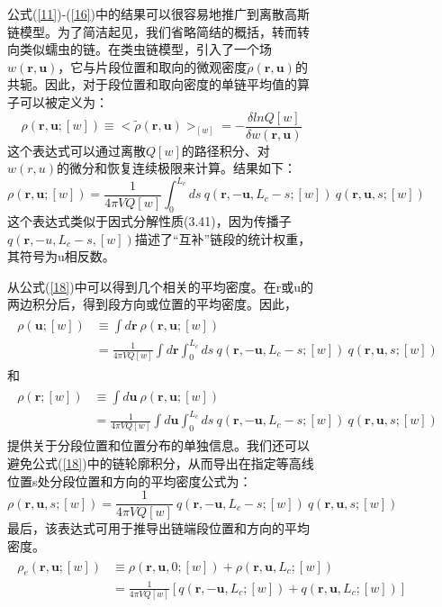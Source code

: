 \begin{figure}[H]
\begin{figure}[ht]
公式(\ref{11})-(\ref{16})中的结果可以很容易地推广到离散高斯链模型。为了简洁起见，我们省略简结的概括，转而转向类似蠕虫的链。在类虫链模型，引入了一个场$w(\mathbf{r},\mathbf{u})$，它与片段位置和取向的微观密度$\tilde{\rho}(\mathbf{r},\mathbf{u})$的共轭。因此，对于段位置和取向密度的单链平均值的算子可以被定义为：
\begin{equation}\label{17}
\rho(\mathbf{r},\mathbf{u};[w])\equiv <\tilde{\rho}(\mathbf{r},\mathbf{u})>_{[w]}=-\frac{\delta lnQ[w]}{\delta w(\mathbf{r},\mathbf{u})}
\end{equation}
这个表达式可以通过离散$Q[w]$的路径积分、对$w(r,u)$的微分和恢复连续极限来计算。结果如下：
\begin{equation}\label{18}
\rho(\mathbf{r},\mathbf{u};[w])=\frac{1}{4\pi VQ[w]}\int_{0}^{L_c}ds~ q(\mathbf{r},-\mathbf{u},L_c-s;[w])~q(\mathbf{r},\mathbf{u},s;[w])
\end{equation}
这个表达式类似于因式分解性质(3.41)，因为传播子$q(\mathbf{r},-u,L_c-s,[w])$描述了“互补”链段的统计权重，其符号为u相反数。

从公式(\ref{18})中可以得到几个相关的平均密度。在r或u的两边积分后，得到段方向或位置的平均密度。因此，
\begin{align}\label{19}
\begin{split}
\rho(\mathbf{u};[w])&\equiv\int d\mathbf{r}~\rho(\mathbf{r},\mathbf{u};[w]) \\&=\frac{1}{4\pi VQ[w]}\int d\mathbf{r} \int_{0}^{L_c}ds~q(\mathbf{r},-\mathbf{u},L_c-s;[w])~q(\mathbf{r},\mathbf{u},s;[w])
\end{split}
\end{align}
和
\begin{align}\label{20}
\begin{split}
\rho(\mathbf{r};[w])&\equiv\int d\mathbf{u}~\rho(\mathbf{r},\mathbf{u};[w]) \\&=\frac{1}{4\pi VQ[w]}\int d\mathbf{u} \int_{0}^{L_c}ds~q(\mathbf{r},-\mathbf{u},L_c-s;[w])~q(\mathbf{r},\mathbf{u},s;[w])
\end{split}
\end{align}
提供关于分段位置和位置分布的单独信息。我们还可以避免公式(\ref{18})中的链轮廓积分，从而导出在指定等高线位置s处分段位置和方向的平均密度公式为：
\begin{equation}\label{21}
\rho(\mathbf{r},\mathbf{u},s;[w])=\frac{1}{4\pi VQ[w]}~q(\mathbf{r},-\mathbf{u},L_c-s;[w])~q(\mathbf{r},\mathbf{u},s;[w])
\end{equation}
最后，该表达式可用于推导出链端段位置和方向的平均密度。
\begin{align}\label{22}
\begin{split}
\rho_e(\mathbf{r},\mathbf{u};[w])&\equiv\rho(\mathbf{r},\mathbf{u},0;[w])+\rho(\mathbf{r},\mathbf{u},L_c;[w])\\ &=\frac{1}{4\pi VQ[w]}[q(\mathbf{r},-\mathbf{u},L_c;[w])+q(\mathbf{r},\mathbf{u},L_c;[w])]
\end{split}
\end{align}


\end{figure}
\end{figure}
